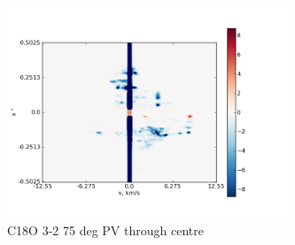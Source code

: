 \documentclass[useAMS,usenatbib]{mn2e}
\begin{document}
%

\begin{figure}
 \includegraphics[width=84mm]{Figures/sim/imageC18O_3-2_75deg_PV_centre.png}

 \caption{C18O 3-2 75 deg PV through centre}
\end{figure}
\end{document}
